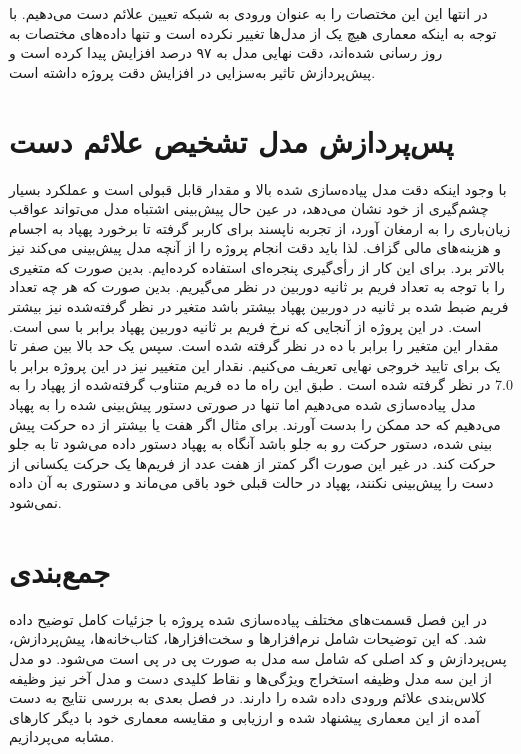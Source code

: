 در انتها این این مختصات را به عنوان ورودی به شبکه تعیین علائم دست می‌دهیم. با توجه به اینکه معماری هیچ یک از مدل‌ها تغییر نکرده است و تنها داده‌های مختصات به روز رسانی شده‌اند، 
دقت نهایی مدل به ۹۷ درصد افزایش پیدا کرده است و پیش‌پردازش تاثیر به‌سزایی در افزایش دقت پروژه داشته است.


\section{پس‌پردازش مدل تشخیص علائم دست}
با وجود اینکه دقت مدل پیاده‌سازی شده بالا و مقدار قابل قبولی است و عملکرد بسیار چشم‌گیری از خود نشان می‌دهد، در عین حال پیش‌بینی اشتباه مدل می‌تواند عواقب زیان‌باری را به ارمغان آورد، 
از تجربه ناپسند برای کاربر گرفته تا برخورد پهپاد به اجسام و هزینه‌های مالی گزاف. لذا باید دقت انجام پروژه را از آنچه مدل پیش‌بینی می‌کند نیز بالاتر برد. برای این کار از رأی‌گیری پنجره‌ای 
استفاده کرده‌ایم. بدین صورت که متغیری را با توجه به تعداد فریم بر ثانیه دوربین در نظر می‌گیریم. بدین صورت که هر چه تعداد فریم ضبط شده بر ثانیه در دوربین پهپاد بیشتر باشد متغیر در نظر گرفته‌شده نیز بیشتر 
است. در این پروژه از آنجایی که نرخ فریم بر ثانیه دوربین پهپاد برابر با سی است.  مقدار این متغیر را برابر با ده در نظر گرفته شده است.  سپس یک حد بالا بین صفر تا یک برای تایید خروجی نهایی تعریف می‌کنیم. نقدار این متغییر نیز در این پروژه برابر با 7.0 در نظر گرفته شده است . طبق این راه ما ده فریم متناوب گرفته‌شده از پهپاد را به مدل پیاده‌سازی شده می‌دهیم اما تنها در صورتی دستور پیش‌بینی شده را به 
پهپاد می‌دهیم که حد ممکن را بدست آورند. برای مثال اگر هفت یا بیشتر از ده حرکت پیش بینی شده، دستور حرکت رو به جلو باشد آنگاه به پهپاد دستور داده می‌شود تا به جلو حرکت کند. 
در غیر این صورت اگر کمتر از هفت عدد از فریم‌ها یک   حرکت یکسانی از دست را پیش‌بینی نکنند، پهپاد در حالت قبلی خود باقی می‌ماند و دستوری به آن داده نمی‌شود.


\section{جمع‌بندی}
در این فصل قسمت‌های مختلف پیاده‌سازی شده پروژه با جزئیات کامل توضیح داده شد. که این توضیحات شامل نرم‌افزار‌ها و سخت‌افزارها، کتاب‌خانه‌ها، پیش‌پردازش، پس‌پردازش و کد اصلی که شامل سه مدل به صورت پی در پی است می‌شود.
دو مدل از این سه مدل وظیفه استخراج ویژگی‌ها و نقاط کلیدی دست و مدل آخر نیز وظیفه کلاس‌بندی علائم ورودی داده شده را دارند.
در فصل بعدی به بررسی نتایج به دست آمده از این معماری پیشنهاد شده و ارزیابی و مقایسه معماری خود با دیگر کار‌های مشابه می‌پردازیم.


